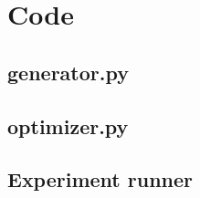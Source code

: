 \section{Code}
\subsection*{generator.py}

\subsection*{optimizer.py}

\subsection*{Experiment runner}


